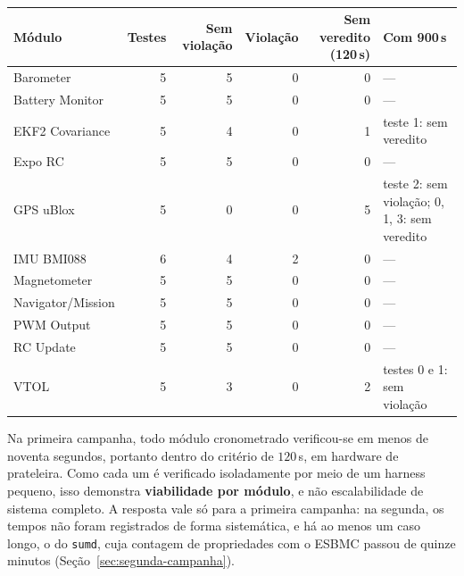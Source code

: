 \begin{table}[!htb]
\centering
\caption{}
\label{tab:testes-separados}
\footnotesize
\begin{tabular}{|l|r|r|r|r|l|}
\hline
\textbf{Módulo} & \textbf{Testes} & \textbf{Sem violação} & \textbf{Violação} & \textbf{Sem veredito (120\,s)} & \textbf{Com 900\,s} \\
\hline
Barometer & 5 & 5 & 0 & 0 & --- \\
Battery Monitor & 5 & 5 & 0 & 0 & --- \\
EKF2 Covariance & 5 & 4 & 0 & 1 & teste 1: sem veredito \\
Expo RC & 5 & 5 & 0 & 0 & --- \\
GPS uBlox & 5 & 0 & 0 & 5 & teste 2: sem violação; 0, 1, 3: sem veredito \\
IMU BMI088 & 6 & 4 & 2 & 0 & --- \\
Magnetometer & 5 & 5 & 0 & 0 & --- \\
Navigator/Mission & 5 & 5 & 0 & 0 & --- \\
PWM Output & 5 & 5 & 0 & 0 & --- \\
RC Update & 5 & 5 & 0 & 0 & --- \\
VTOL & 5 & 3 & 0 & 2 & testes 0 e 1: sem violação \\
\hline
\end{tabular}
\end{table}

\begin{tcolorbox}[colback=blue!5!white, colframe=blue!60!black,
title=\textbf{Resposta à QE1 --- Latência de verificação}]
Na primeira campanha, todo módulo cronometrado verificou-se em menos de noventa
segundos, portanto dentro do critério de $120$\,s, em hardware de prateleira.
Como cada um é verificado isoladamente por meio de um harness pequeno, isso
demonstra \textbf{viabilidade por módulo}, e não escalabilidade de sistema
completo. A resposta vale só para a primeira campanha: na segunda, os tempos não
foram registrados de forma sistemática, e há ao menos um caso longo, o do
\texttt{sumd}, cuja contagem de propriedades com o ESBMC passou de quinze minutos
(Seção~\ref{sec:segunda-campanha}).
\end{tcolorbox}

